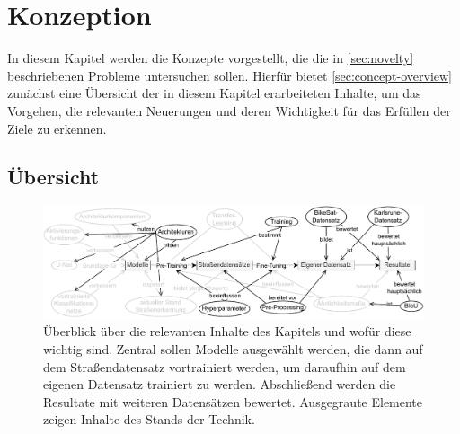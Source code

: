 \chapter{Konzeption} %

In diesem Kapitel werden die Konzepte vorgestellt, die die in \autoref{sec:novelty} 
beschriebenen Probleme untersuchen sollen. Hierfür bietet \autoref{sec:concept-overview}
\textit{}
zunächst eine Übersicht der in diesem Kapitel erarbeiteten Inhalte, um das Vorgehen, 
die relevanten Neuerungen und deren Wichtigkeit für das Erfüllen der Ziele zu erkennen. 

\section{Übersicht} \label{sec:concept-overview}

\begin{figure}[h]
	\centering
	\includegraphics[width=1.\textwidth]{Bilder/overview.drawio.pdf} 
	\caption{Überblick über die relevanten Inhalte des Kapitels und wofür diese wichtig sind. Zentral sollen Modelle 
	ausgewählt werden, die dann auf dem Straßendatensatz vortrainiert werden, um daraufhin 
	auf dem eigenen Datensatz trainiert zu werden. Abschließend werden die Resultate mit weiteren Datensätzen bewertet.
	Ausgegraute Elemente zeigen Inhalte des Stands der Technik.}
	\label{fig:overview-concept}
\end{figure} 

